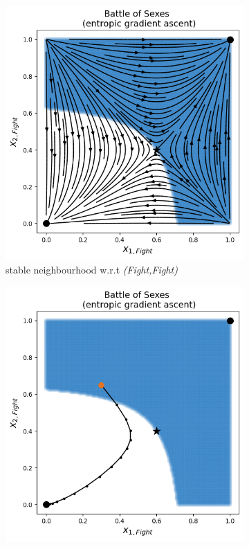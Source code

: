 \begin{figure}[H]
\captionsetup{justification=centering}
\centering
\begin{subfigure}{.5\textwidth}
    \centering
    \includegraphics[width=\textwidth]{logos/BattleOfSexes3.png}
    \caption{stable neighbourhood w.r.t \textit{(Fight,Fight)}}
    \label{fig:BOS2a}
\end{subfigure}%
\begin{subfigure}{.5\textwidth}
    \centering
    \includegraphics[width=\textwidth]{logos/BattleOfSexes4.png}

\end{subfigure}
\end{figure}
